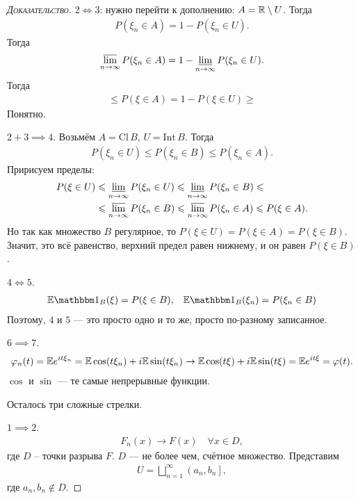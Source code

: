 \documentclass[../main.tex]{subfiles}
\begin{document}
\begin{proof}[\normalfont\textsc{Доказательство}]
 $ 2 \iff 3 $: нужно перейти к дополнению: $ A = \mathbb{R} \setminus U $. Тогда
 \begin{align*}
  P(\xi_n \in A) = 1 - P(\xi_n \in U).
 \end{align*} Тогда
 \begin{align*}
  \varlimsup_{n \to \infty} P(\xi_n \in A) = 1 - \varliminf_{n \to \infty} P(\xi_n \in U).
 \end{align*} Тогда 
 \begin{align*}
  \leqslant P(\xi \in A) = 1 - P(\xi \in U) \geqslant 
 \end{align*} Понятно.

 $ 2 + 3 \implies 4 $. Возьмём $ A = \mathrm{Cl}\,B $, $ U = \mathrm{Int}\,B $. Тогда
 \begin{align*}
  P(\xi_n \in U) \leqslant P(\xi_n \in B) \leqslant P(\xi_n \in A).
 \end{align*} Пририсуем пределы:
 \begin{align*}
  P(\xi \in U) &\leqslant \varliminf_{n \to \infty} P(\xi_n \in U) \leqslant \varliminf_{n \to \infty} P(\xi_n \in B) \leqslant \\
  &\leqslant \varlimsup_{n \to \infty} P(\xi_n \in B) \leqslant \varlimsup_{n \to \infty} P(\xi_n \in A) \leqslant P(\xi \in A).
 \end{align*} Но так как множество $ B $ регулярное, то $ P(\xi \in U) = P(\xi \in A) = P(\xi \in B) $. Значит, это всё равенство, верхний предел равен нижнему, и он равен $ P(\xi \in B) $.

 $ 4 \iff 5 $.
 \begin{align*}
  \E \Ind_B (\xi) = P(\xi \in B), && \E \Ind_B(\xi_n) = P(\xi_n \in B)
 \end{align*} Поэтому, $ 4 $ и $ 5 $ --- это просто одно и то же, просто по-разному записанное.

 $ 6 \implies 7 $.
 \begin{align*}
  \varphi_n(t) = \mathbb E e^{it\xi_n} = \mathbb E \cos(t\xi_n) + i \mathbb E \sin(t\xi_n) \to \mathbb E\cos(t\xi) + i\mathbb E\sin(t\xi) = \mathbb E e^{it\xi} = \varphi(t).
 \end{align*} $ \cos $ и $ \sin $ ---  те самые непрерывные функции.

 Осталось три сложные стрелки.

 $ 1 \implies 2 $.
 \begin{align*}
  F_n(x) \to F(x) \quad \forall x \in D,
 \end{align*} где $ D $ -- точки разрыва $ F $. $ D $ --- не более чем, счётное множество. Представим
 \begin{align*}
  U = \bigsqcup_{n=1}^{\infty} \left(a_n, b_n\right],
 \end{align*} где $ a_n, b_n \notin D $.


\end{proof}
\end{document}
